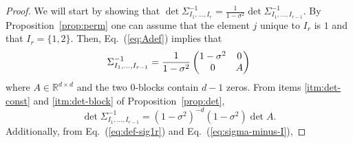 \documentclass[final, 12pt]{colt2018}
\renewcommand{\eqref}[1]{Eq.~(\ref{#1})}
\begin{document}
\begin{proof}
We will start by showing that $\det \Sigma_{I_1,\dots,I_r}^{-1} = \frac{1}{1-\sigma^2} \det \Sigma^{-1}_{I_1,\dots,I_{r-1}}$.
By Proposition~\ref{prop:perm} one can assume that the element $j$ unique to $I_r$ is $1$ and that $I_r = \{1,2\}$. Then, \eqref{eq:Adef} implies that
\begin{align}
\Sigma_{I_1,\dots,I_{r-1}}^{-1} = \frac{1}{1-\sigma^2}\begin{pmatrix}
1 - \sigma^2 & 0 \\
0 & A
\end{pmatrix}\notag
\end{align}
where $A \in \mathbb{R}^{d\times d}$ and the two $0$-blocks contain $d-1$ zeros. From items \ref{itm:det-const} and \ref{itm:det-block} of Proposition~\ref{prop:det},
\begin{equation} \label{eq:g7}
\det \Sigma_{I_1,\dots,I_{r-1}}^{-1}
= (1-\sigma^2)^{-d} (1-\sigma^2) \det A.
\end{equation}
Additionally, from \eqref{eq:def-sig1r} and \eqref{eq:sigma-minus-I},


\end{proof}
\end{document}
